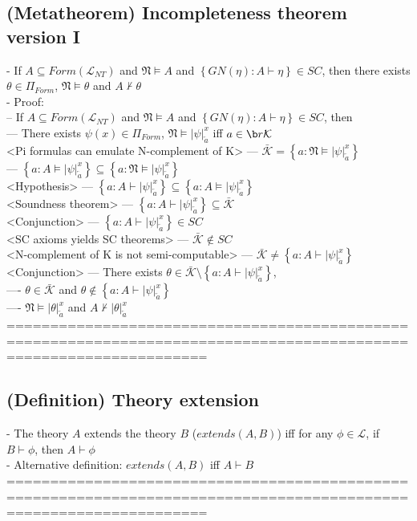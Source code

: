 \documentclass{book}
\newcommand{\inot}{\not}
\newcommand{\set}[1]{\left\{ #1 \right\}}
\newcommand{\sub}[3]{\left|#1\right|_{#3}^{#2}}
\begin{document}
\subsection{(Metatheorem) Incompleteness theorem version I} %
	- If $A \subseteq Form(\mathcal{L}_{NT})$ and $\mathfrak{N} \vDash A$ and $\set{GN(\eta): A \vdash \eta} \in SC$, then there exists $\theta \in \Pi_{Form}$, $\mathfrak{N} \vDash \theta$ and $A \inot \vdash \theta$ \\
	- Proof: \\
		-- If $A \subseteq Form(\mathcal{L}_{NT})$ and $\mathfrak{N} \vDash A$ and $\set{GN(\eta): A \vdash \eta} \in SC$, then \\
			--- There exists $\psi(x) \in \Pi_{Form}$, $\mathfrak{N} \vDash \sub{\psi}{x}{\overleftarrow{a}}$ iff $a \in \b	r{\mathcal{K}}$ \\ <Pi formulas can emulate N-complement of K>
			--- $\bar{\mathcal{K}} = \set{a: \mathfrak{N} \vDash \sub{\psi}{x}{\overleftarrow{a}}}$ \\
			--- $\set{a: A \vDash \sub{\psi}{x}{\overleftarrow{a}}} \subseteq \set{a: \mathfrak{N} \vDash \sub{\psi}{x}{\overleftarrow{a}}}$ \\ <Hypothesis>
			--- $\set{a: A \vdash \sub{\psi}{x}{\overleftarrow{a}}} \subseteq \set{a: A \vDash \sub{\psi}{x}{\overleftarrow{a}}}$ \\ <Soundness theorem>
			--- $\set{a: A \vdash \sub{\psi}{x}{\overleftarrow{a}}} \subseteq \bar{\mathcal{K}}$ \\ <Conjunction>
			--- $\set{a: A \vdash \sub{\psi}{x}{\overleftarrow{a}}} \in SC$ \\ <SC axioms yields SC theorems>
			--- $\bar{\mathcal{K}} \inot \in SC$ \\ <N-complement of K is not semi-computable>
			--- $\bar{\mathcal{K}} \inot = \set{a: A \vdash \sub{\psi}{x}{\overleftarrow{a}}}$ \\ <Conjunction>
			--- There exists $\theta \in \bar{\mathcal{K}} \setminus \set{a: A \vdash \sub{\psi}{x}{\overleftarrow{a}}}$, \\
				---- $\theta \in \bar{\mathcal{K}}$ and $\theta \inot \in \set{a: A \vdash \sub{\psi}{x}{\overleftarrow{a}}}$ \\
				---- $\mathfrak{N} \vDash \sub{\theta}{x}{\overleftarrow{a}}$ and $A \inot \vdash \sub{\theta}{x}{\overleftarrow{a}}$ \\
	===================================================================================================================
\subsection{(Definition) Theory extension} %
	- The theory $A$ extends the theory $B$ ($extends(A, B)$) iff for any $\phi \in \mathcal{L}$, if $B \vdash \phi$, then $A \vdash \phi$ \\
	- Alternative definition: $extends(A, B)$ iff $A \vdash B$ \\
	===================================================================================================================	
\end{document}
